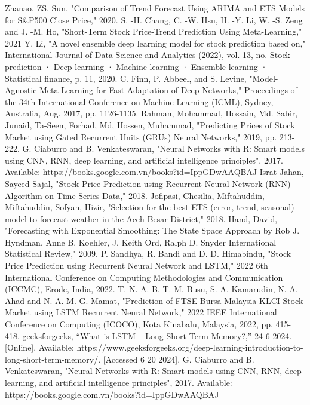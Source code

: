 \documentclass{ieeeojies}
\begin{document}
\vspace{-18pt}
\begin{thebibliography}{00}
 Zhanao, ZS, Sun, "Comparison of Trend Forecast Using ARIMA and ETS Models for S\&P500 Close Price," 2020.
 S. -H. Chang, C. -W. Hsu, H. -Y. Li, W. -S. Zeng and J. -M. Ho, "Short-Term Stock Price-Trend Prediction Using Meta-Learning," 2021 
 Y. Li, "A novel ensemble deep learning model for stock prediction based on," International Journal of Data Science and Analytics (2022), vol. 13, no. Stock prediction · Deep learning · Machine learning · Ensemble learning · Statistical finance, p. 11, 2020. 
 C. Finn, P. Abbeel, and S. Levine, "Model-Agnostic Meta-Learning for Fast Adaptation of Deep Networks," Proceedings of the 34th International Conference on Machine Learning (ICML), Sydney, Australia, Aug. 2017, pp. 1126-1135.
 Rahman, Mohammad, Hossain, Md. Sabir, Junaid, Ta-Seen, Forhad, Md, Hossen, Muhammad, "Predicting Prices of Stock Market using Gated Recurrent Units (GRUs) Neural Networks," 2019, pp. 213-222. 
 G. Ciaburro and B. Venkateswaran, "Neural Networks with R: Smart models using CNN, RNN, deep learning, and artificial intelligence principles", 2017. Available: https://books.google.com.vn/books?id=IppGDwAAQBAJ
 Israt Jahan, Sayeed Sajal, "Stock Price Prediction using Recurrent Neural Network (RNN) Algorithm on Time-Series Data," 2018.
 Jofipasi, Chesilia, Miftahuddin, Miftahuddin, Sofyan, Hizir, "Selection for the best ETS (error, trend, seasonal) model to forecast weather in the Aceh Besar District," 2018.
 Hand, David, "Forecasting with Exponential Smoothing: The State Space Approach by Rob J. Hyndman, Anne B. Koehler, J. Keith Ord, Ralph D. Snyder International Statistical Review," 2009.
 P. Sandhya, R. Bandi and D. D. Himabindu, "Stock Price Prediction using Recurrent Neural Network and LSTM," 2022 6th International Conference on Computing Methodologies and Communication (ICCMC), Erode, India, 2022.
 T. N. A. B. T. M. Busu, S. A. Kamarudin, N. A. Ahad and N. A. M. G. Mamat, "Prediction of FTSE Bursa Malaysia KLCI Stock Market using LSTM Recurrent Neural Network," 2022 IEEE International Conference on Computing (ICOCO), Kota Kinabalu, Malaysia, 2022, pp. 415-418. 
 geeksforgeeks, “What is LSTM – Long Short Term Memory?,” 24 6 2024. [Online]. Available: https://www.geeksforgeeks.org/deep-learning-introduction-to-long-short-term-memory/. [Accessed 6 20 2024].
 G. Ciaburro and B. Venkateswaran, "Neural Networks with R: Smart models using CNN, RNN, deep learning, and artificial intelligence principles", 2017. Available: https://books.google.com.vn/books?id=IppGDwAAQBAJ

\end{thebibliography}
\end{document}
